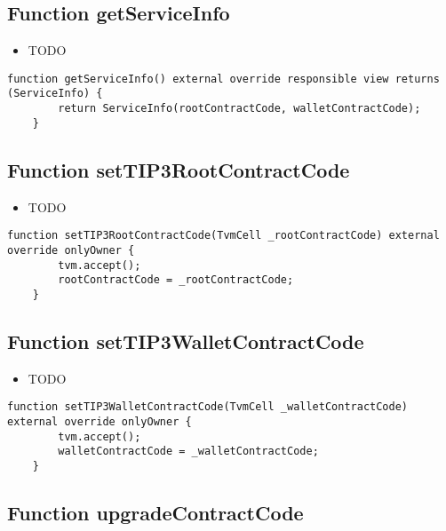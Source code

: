 \subsection{Function getServiceInfo}

\noindent\begin{itemize}
\item TODO
\end{itemize}

\begin{lstlisting}[firstnumber=131]
    function getServiceInfo() external override responsible view returns (ServiceInfo) {
        return ServiceInfo(rootContractCode, walletContractCode);
    }
\end{lstlisting}

\subsection{Function setTIP3RootContractCode}

\noindent\begin{itemize}
\item TODO
\end{itemize}

\begin{lstlisting}[firstnumber=118]
    function setTIP3RootContractCode(TvmCell _rootContractCode) external override onlyOwner {
        tvm.accept();
        rootContractCode = _rootContractCode;
    }
\end{lstlisting}

\subsection{Function setTIP3WalletContractCode}

\noindent\begin{itemize}
\item TODO
\end{itemize}

\begin{lstlisting}[firstnumber=126]
    function setTIP3WalletContractCode(TvmCell _walletContractCode) external override onlyOwner {
        tvm.accept();
        walletContractCode = _walletContractCode;
    }
\end{lstlisting}

\subsection{Function upgradeContractCode}

